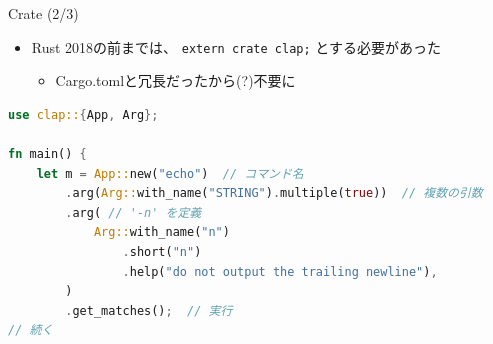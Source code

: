 \documentclass[cjk,dvipdfmx,10pt,compress,fragile%
hyperref={bookmarks=true,bookmarksnumbered=true,bookmarksopen=false,%
colorlinks=false,%
pdftitle={第 134 回 関西 Debian 勉強会},%
pdfauthor={小林},%
pdfsubject={資料},%
}]{beamer}
\newenvironment{commandline}%
{\VerbatimEnvironment
  \begin{Sbox}\begin{minipage}{0.9\hsize}\begin{fontsize}{8}{8} \color{white} \begin{BVerbatim}}%
{\end{BVerbatim}\end{fontsize}\end{minipage}\end{Sbox}
  \setlength{\fboxsep}{8pt}

\vspace{6pt}%
\fcolorbox{white}{black}{\TheSbox}

\vspace{3pt}%
}
\begin{document}

\begin{frame}[t,fragile]{Crate (2/3)}
\begin{itemize}
 \item Rust 2018の前までは、 \verb|extern crate clap;| とする必要があった
       \begin{itemize}
	\item Cargo.tomlと冗長だったから(?)不要に
       \end{itemize}
\end{itemize}
\begin{lstlisting}[language=Rust,style=boxed,style=colouredRust,basicstyle=\small\tt,lineskip=-2pt]
use clap::{App, Arg};

fn main() {
    let m = App::new("echo")  // コマンド名
        .arg(Arg::with_name("STRING").multiple(true))  // 複数の引数
        .arg( // '-n' を定義
            Arg::with_name("n")
                .short("n")
                .help("do not output the trailing newline"),
        )
        .get_matches();  // 実行
// 続く\end{lstlisting}
\end{frame}
\end{document}
